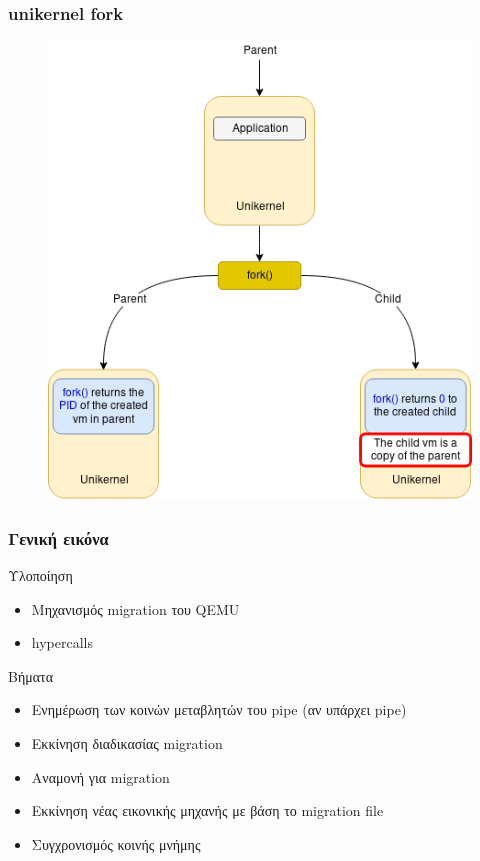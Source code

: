 \documentclass[red,slidestop,notes,compress,mathserif]{beamer}
\begin{document}
\begin{frame}
\frametitle{unikernel fork}
\begin{figure}
\center
\includegraphics[scale=0.4]{figures/unikernel_fork.png}
\end{figure}
\end{frame}

\begin{frame}
\frametitle{Γενική εικόνα}
\begin{block}{Υλοποίηση}
\begin{itemize}
\item Μηχανισμός migration του QEMU
\item hypercalls 
\end{itemize}
\end{block}
\begin{block}{Βήματα}
\begin{itemize}
\item Ενημέρωση των κοινών μεταβλητών του pipe (αν υπάρχει pipe)
\item Εκκίνηση διαδικασίας migration
\item Αναμονή για migration
\item Εκκίνηση νέας εικονικής μηχανής με βάση το migration file
\item Συγχρονισμός κοινής μνήμης
\end{itemize}
\end{block}
\end{frame}
\end{document}
